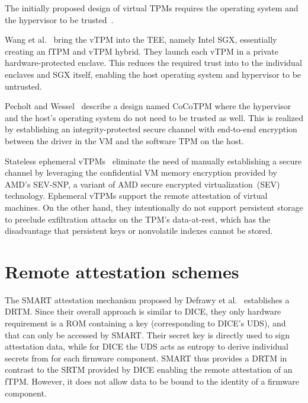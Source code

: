 The initially proposed design of virtual \acp{TPM} requires the operating system and the hypervisor to be trusted~\cite{268868}.

Wang et al.~\cite{Wang2019} bring the vTPM into the \ac{TEE}, namely Intel SGX, essentially creating an fTPM and vTPM hybrid.
They launch each vTPM in a private hardware-protected enclave.
This reduces the required trust into to the individual enclaves and SGX itself, enabling the host operating system and hypervisor to be untrusted.

Pecholt and Wessel~\cite{Pecholt2022} describe a design named CoCoTPM where the hypervisor and the host's operating system do not need to be trusted as well.
This is realized by establishing an integrity-protected secure channel with end-to-end encryption between the driver in the VM and the software TPM on the host.

Stateless ephemeral vTPMs~\cite{Narayanan2023} eliminate the need of manually establishing a secure channel by leveraging the confidential VM memory encryption provided by AMD's SEV-SNP, a variant of AMD secure encrypted virtualization~(SEV) technology.
Ephemeral vTPMs support the remote attestation of virtual machines.
On the other hand, they intentionally do not support persistent storage to preclude exfiltration attacks on the TPM's data-at-rest, which has the disadvantage that persistent keys or nonvolatile indexes cannot be stored.

\section{Remote attestation schemes}



The SMART attestation mechanism proposed by Defrawy et al.~\cite{EURECOM+3536} establishes a \ac{DRTM}.
Since their overall approach is similar to \ac{DICE}, they only hardware requirement is a ROM containing a key (corresponding to DICE's \ac{UDS}), and that can only be accessed by SMART\@.
Their secret key is directly used to sign attestation data, while for \ac{DICE} the \ac{UDS} acts as entropy to derive individual secrets from for each firmware component.
SMART thus provides a \ac{DRTM} in contrast to the \ac{SRTM} provided by \ac{DICE} enabling the remote attestation of an \ac{fTPM}.
However, it does not allow data to be bound to the identity of a firmware component.

